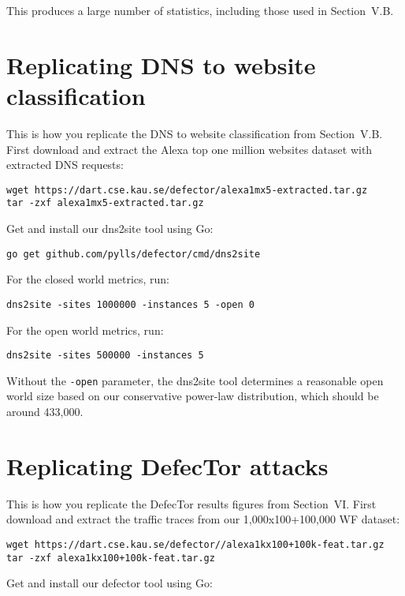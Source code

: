 \documentclass{article}
\newcommand{\name}{DefecTor\xspace}
\begin{document}
This produces a large number of statistics, including those used in Section~V.B.

\section{Replicating DNS to website classification}
This is how you replicate the DNS to website classification from Section~V.B.
First download and extract the Alexa top one million websites dataset with
extracted DNS requests:

\begin{lstlisting}
wget https://dart.cse.kau.se/defector/alexa1mx5-extracted.tar.gz
tar -zxf alexa1mx5-extracted.tar.gz
\end{lstlisting}

Get and install our dns2site tool using Go:

\begin{lstlisting}
go get github.com/pylls/defector/cmd/dns2site
\end{lstlisting}

For the closed world metrics, run:

\begin{lstlisting}
dns2site -sites 1000000 -instances 5 -open 0
\end{lstlisting}

For the open world metrics, run:

\begin{lstlisting}
dns2site -sites 500000 -instances 5
\end{lstlisting}

Without the \texttt{-open} parameter, the dns2site tool determines a reasonable
open world size based on our conservative power-law distribution,
which should be around 433,000.

\section{Replicating \name attacks}
This is how you replicate the \name results figures from Section~VI.  First
download and extract the traffic traces from our 1,000x100+100,000 WF dataset:

\begin{lstlisting}
wget https://dart.cse.kau.se/defector//alexa1kx100+100k-feat.tar.gz
tar -zxf alexa1kx100+100k-feat.tar.gz
\end{lstlisting}

Get and install our defector tool using Go:
\end{document}
